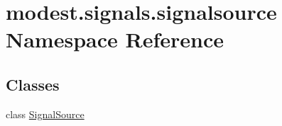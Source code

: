 \hypertarget{namespacemodest_1_1signals_1_1signalsource}{}\section{modest.\+signals.\+signalsource Namespace Reference}
\label{namespacemodest_1_1signals_1_1signalsource}
\subsection*{Classes}
\begin{DoxyCompactItemize}
\item 
class \hyperlink{classmodest_1_1signals_1_1signalsource_1_1SignalSource}{Signal\+Source}
\end{DoxyCompactItemize}

